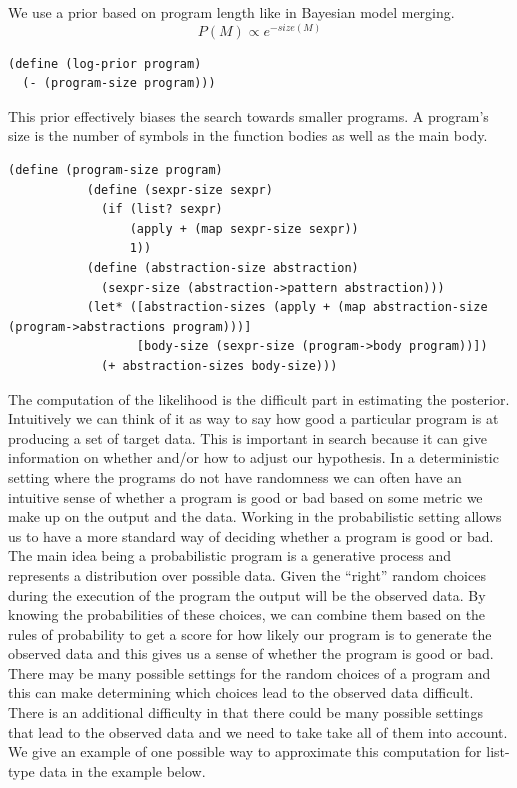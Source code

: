 \documentclass[a4paper,10pt]{article}
\begin{document}
We use a prior based on program length like in Bayesian model merging.  
\begin{equation}P(M)\propto e^{-size(M)}\end{equation}
\begin{lstlisting}[frame=trBL]
(define (log-prior program)
  (- (program-size program)))
\end{lstlisting}
This prior effectively biases the search towards smaller programs.  A program's size is the number of symbols in the function bodies as well as the main body.
\begin{lstlisting}[frame=trBL]
(define (program-size program)
           (define (sexpr-size sexpr)
             (if (list? sexpr)
                 (apply + (map sexpr-size sexpr))
                 1))
           (define (abstraction-size abstraction)
             (sexpr-size (abstraction->pattern abstraction)))
           (let* ([abstraction-sizes (apply + (map abstraction-size (program->abstractions program)))]
                  [body-size (sexpr-size (program->body program))])
             (+ abstraction-sizes body-size)))
\end{lstlisting}
The computation of the likelihood is the difficult part in estimating the posterior.  Intuitively we can think of it as way to say how good a particular program is at producing a set of target data.  This is important in search because it can give information on whether and/or how to adjust our hypothesis.  In a deterministic setting where the programs do not have randomness we can often have an intuitive sense of whether a program is good or bad based on some metric we make up on the output and the data.  Working in the probabilistic setting allows us to have a more standard way of deciding whether a program is good or bad.  The main idea being a probabilistic program is a generative process and represents a distribution over possible data.  Given the ``right'' random choices during the execution of the program the output will be the observed data.  By knowing the probabilities of these choices, we can combine them based on the rules of probability to get a score for how likely our program is to generate the observed data and this gives us a sense of whether the program is good or bad.  There may be many possible settings for the random choices of a program and this can make determining which choices lead to the observed data difficult.  There is an additional difficulty in that there could be many possible settings that lead to the observed data and we need to take take all of them into account.  We give an example of one possible way to approximate this computation for list-type data in the example below.
\end{document}
